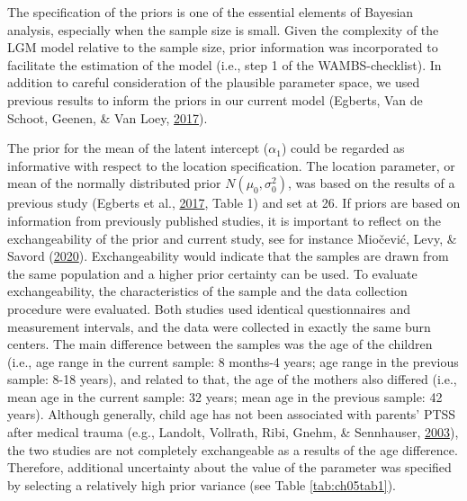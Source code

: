 \documentclass[openright,titlepage,12pt,a4paper]{book}
\begin{document}
The specification of the priors is one of the essential elements of Bayesian analysis, especially when the sample size is small. Given the complexity of the LGM model relative to the sample size, prior information was incorporated to facilitate the estimation of the model (i.e., step 1 of the WAMBS-checklist). In addition to careful consideration of the plausible parameter space, we used previous results to inform the priors in our current model (Egberts, Van de Schoot, Geenen, \& Van Loey, \protect\hyperlink{ref-egberts_parents_2017}{2017}).

The prior for the mean of the latent intercept (\(\alpha_1\)) could be regarded as informative with respect to the location specification. The location parameter, or mean of the normally distributed prior \(N(\mu_0, \sigma_0^2)\), was based on the results of a previous study (Egberts et al., \protect\hyperlink{ref-egberts_parents_2017}{2017}, Table 1) and set at 26. If priors are based on information from previously published studies, it is important to reflect on the exchangeability of the prior and current study, see for instance Miočević, Levy, \& Savord (\protect\hyperlink{ref-miocevic_role_2020}{2020}). Exchangeability would indicate that the samples are drawn from the same population and a higher prior certainty can be used. To evaluate exchangeability, the characteristics of the sample and the data collection procedure were evaluated. Both studies used identical questionnaires and measurement intervals, and the data were collected in exactly the same burn centers. The main difference between the samples was the age of the children (i.e., age range in the current sample: 8 months-4 years; age range in the previous sample: 8-18 years), and related to that, the age of the mothers also differed (i.e., mean age in the current sample: 32 years; mean age in the previous sample: 42 years). Although generally, child age has not been associated with parents' PTSS after medical trauma (e.g., Landolt, Vollrath, Ribi, Gnehm, \& Sennhauser, \protect\hyperlink{ref-landolt_incidence_2003}{2003}), the two studies are not completely exchangeable as a results of the age difference. Therefore, additional uncertainty about the value of the parameter was specified by selecting a relatively high prior variance (see Table \ref{tab:ch05tab1}).
\end{document}
